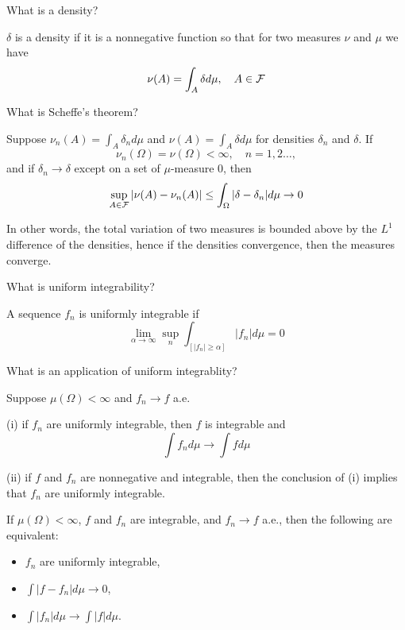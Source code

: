 \documentclass[avery5388,grid,frame]{flashcards}
\begin{document}
\begin{flashcard}
    {What is a density?}
    \begin{definition}
        $\delta$ is a density if it is a nonnegative function so that for two measures $\nu$ and $\mu$ we have
        $$\nu(A) = \int_A \delta d\mu, \quad A \in \mathcal F$$
    \end{definition}
\end{flashcard}


\begin{flashcard}
    {What is Scheffe's theorem?}
    \begin{theorem}
        Suppose $\nu_n(A) = \int_A \delta_n d\mu$ and $\nu(A) = \int_A \delta d\mu$ for densities $\delta_n$ and $\delta$. If
        $$\nu_n(\Omega) = \nu(\Omega)< \infty, \quad n = 1,2\dots,$$
        and if $\delta_n \rightarrow \delta$ except on a set of $\mu$-measure 0, then
        $$\sup_{A \in \mathcal F} | \nu(A) - \nu_n(A) | \leq \int_\Omega |\delta - \delta_n| d\mu \rightarrow 0$$
    \end{theorem}

    \begin{remark}
        In other words, the total variation of two measures is bounded above by the $L^1$ difference of the densities, hence if the densities convergence, then the measures converge.
    \end{remark}
\end{flashcard}


\begin{flashcard}
    {What is uniform integrability?}
    \begin{definition}
        A sequence $f_n$ is uniformly integrable if
        $$\lim_{\alpha \rightarrow \infty} \sup_n \int_{[|f_n| \geq \alpha]} |f_n| d\mu = 0$$
    \end{definition}
\end{flashcard}


\begin{flashcard}
    {What is an application of uniform integrablity?}
    \begin{theorem}
        Suppose $\mu(\Omega) < \infty$ and $f_n \rightarrow f$ a.e.

        (i) if $f_n$ are uniformly integrable, then $f$ is integrable and
        $$\int f_n d\mu \rightarrow \int f d\mu$$

        (ii) if $f$ and $f_n$ are nonnegative and integrable, then the conclusion of (i) implies that $f_n$ are uniformly integrable.
    \end{theorem}
    \begin{theorem}
        If $\mu(\Omega) < \infty$, $f$ and $f_n$ are integrable, and $f_n \rightarrow f$ a.e., then the following are equivalent:
        \begin{itemize}
            \item $f_n$ are uniformly integrable,
            \item $\int | f - f_n | d\mu \rightarrow 0$,
            \item $\int |f_n| d\mu \rightarrow \int |f| d\mu$.
        \end{itemize}
    \end{theorem}
\end{flashcard}
\end{document}
